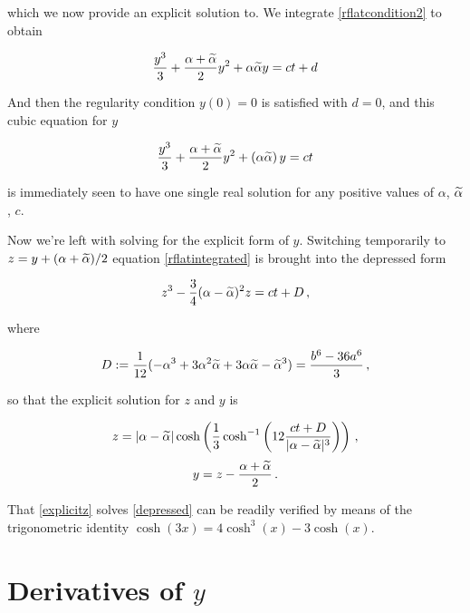 which we now provide an explicit solution to. We integrate \eqref{rflatcondition2} to obtain

\begin{equation}
	\frac{y^3}{3} + \frac{\alpha + \widetilde{\alpha}}{2} y^2 + \alpha \widetilde{\alpha} y = ct + d \label{rflatintegrated}
\end{equation}

And then the regularity condition $y(0)=0$ is satisfied with $d=0$, and this cubic equation for $y$

\begin{equation}
	\frac{y^3}{3} + \frac{\alpha + \widetilde{\alpha}}{2} y^2 + (\alpha \widetilde{\alpha})\, y = ct
\end{equation}

is immediately seen to have one single real solution for any positive values of $\alpha$, $\widetilde{\alpha}$, $c$.

Now we're left with solving for the explicit form of $y$. Switching temporarily to $z = y + (\alpha + \widetilde{\alpha})/2$ equation \eqref{rflatintegrated} is brought into the depressed form

\begin{equation}
	z^3 - \frac{3}4 (\alpha - \widetilde{\alpha})^2 z = ct + D\,,
	\label{depressed}
\end{equation}

where

\begin{equation}
	D := \frac{1}{12}(-\alpha^3 + 3 \alpha^2 \widetilde{\alpha} + 3 \alpha\widetilde{\alpha} - \widetilde{\alpha}^3) = \frac{b^6-36a^6}{3}\,,
	\label{dprime}
\end{equation}

so that the explicit solution for $z$ and $y$ is

\begin{equation}
	z = |\alpha - \widetilde{\alpha}| \cosh \left( \frac{1}{3} \cosh^{-1} \left( 12 \frac{ct + D}{|\alpha-\widetilde{\alpha}|^3} \right) \right)  \,,
	\label{explicitz}
\end{equation}
\begin{equation}
	y = z - \frac{\alpha + \widetilde{\alpha}}2 \,.
	\label{explicitY}
\end{equation}

That \eqref{explicitz} solves \eqref{depressed} can be readily verified by means of the trigonometric identity $\cosh(3x) = 4 \cosh^3(x) - 3 \cosh(x)$.



\section{Derivatives of $y$}\label{sec:yderivatives}
\newcommand{\conethird}{\ensuremath{C_{1/3}}}
\newcommand{\CF}{\ensuremath{\conethird(T)}}
\newcommand{\CFp}{\ensuremath{\conethird^{\,\prime}(T)}}
\newcommand{\CFpp}{\ensuremath{\conethird^{\,\prime\prime}(T)}}


